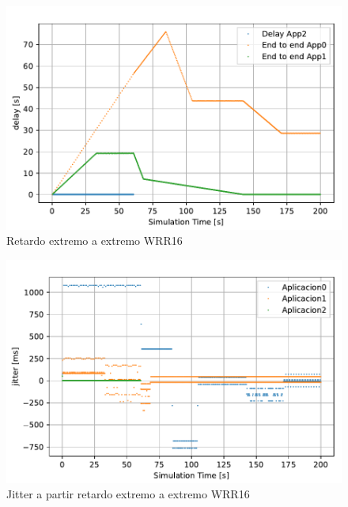 \begin{figure}[!ht]
    \centering
    \includegraphics{graficas/WRR/delay_wrr.pdf}
    \caption{Retardo extremo a extremo WRR16}
    \label{fig:sinqos_pktreceived99100}
\end{figure}

\begin{figure}
    \centering
    \includegraphics{graficas/WRR/jitter_WRR.pdf}
    \caption{Jitter a partir retardo extremo a extremo WRR16}
    \label{fig:sinqos_pktreceived99100}
\end{figure}

